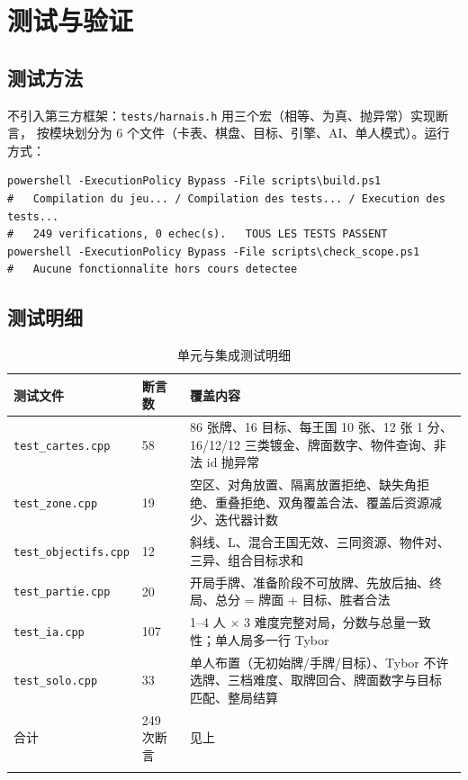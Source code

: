 \documentclass[11pt,a4paper]{ctexart}
\newcommand{\cl}[1]{\texttt{#1}}
\begin{document}
\section{测试与验证}

\subsection{测试方法}
不引入第三方框架：\cl{tests/harnais.h} 用三个宏（相等、为真、抛异常）实现断言，
按模块划分为 6 个文件（卡表、棋盘、目标、引擎、AI、单人模式）。运行方式：
\begin{center}
\begin{minipage}{\linewidth}
\begin{lstlisting}
powershell -ExecutionPolicy Bypass -File scripts\build.ps1
#   Compilation du jeu... / Compilation des tests... / Execution des tests...
#   249 verifications, 0 echec(s).   TOUS LES TESTS PASSENT
powershell -ExecutionPolicy Bypass -File scripts\check_scope.ps1
#   Aucune fonctionnalite hors cours detectee
\end{lstlisting}
\end{minipage}
\end{center}

\subsection{测试明细}
\begin{longtable}{p{3.9cm}p{2.6cm}p{7.3cm}}
\toprule
测试文件 & 断言数 & 覆盖内容 \\
\midrule
\cl{test\_cartes.cpp} & 58 & 86 张牌、16 目标、每王国 10 张、12 张 1 分、16/12/12 三类镀金、牌面数字、物件查询、非法 id 抛异常 \\
\cl{test\_zone.cpp} & 19 & 空区、对角放置、隔离放置拒绝、缺失角拒绝、重叠拒绝、双角覆盖合法、覆盖后资源减少、迭代器计数 \\
\cl{test\_objectifs.cpp} & 12 & 斜线、L、混合王国无效、三同资源、物件对、三异、组合目标求和 \\
\cl{test\_partie.cpp} & 20 & 开局手牌、准备阶段不可放牌、先放后抽、终局、总分 = 牌面 + 目标、胜者合法 \\
\cl{test\_ia.cpp} & 107 & 1--4 人 $\times$ 3 难度完整对局，分数与总量一致性；单人局多一行 Tybor \\
\cl{test\_solo.cpp} & 33 & 单人布置（无初始牌/手牌/目标）、Tybor 不许选牌、三档难度、取牌回合、牌面数字与目标匹配、整局结算 \\
\midrule
合计 & 249 次断言 & 见上 \\
\bottomrule
\caption{单元与集成测试明细}
\label{tab:tests}
\end{longtable}
\end{document}
